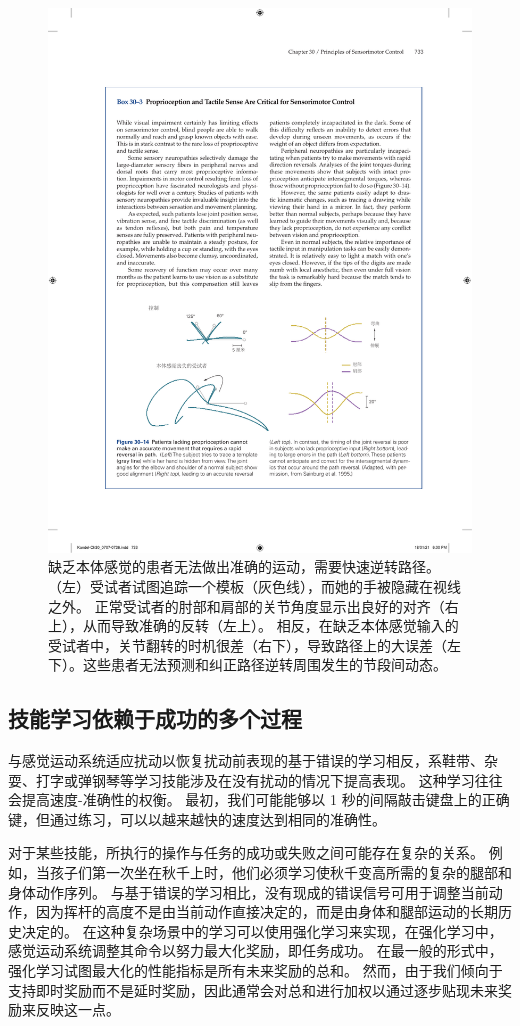 \begin{figure}[htbp]
	\centering
	\includegraphics[width=0.85\linewidth]{chap30/fig_30_14}
	\caption{缺乏本体感觉的患者无法做出准确的运动，需要快速逆转路径。
		（左）受试者试图追踪一个模板（灰色线），而她的手被隐藏在视线之外。
		正常受试者的肘部和肩部的关节角度显示出良好的对齐（右上），从而导致准确的反转（左上）。
		相反，在缺乏本体感觉输入的受试者中，关节翻转的时机很差（右下），导致路径上的大误差（左下）。这些患者无法预测和纠正路径逆转周围发生的节段间动态。}
	\label{fig:30_14}
\end{figure}


\subsection{技能学习依赖于成功的多个过程}

与感觉运动系统适应扰动以恢复扰动前表现的基于错误的学习相反，系鞋带、杂耍、打字或弹钢琴等学习技能涉及在没有扰动的情况下提高表现。
这种学习往往会提高速度-准确性的权衡。
最初，我们可能能够以 1 秒的间隔敲击键盘上的正确键，但通过练习，可以以越来越快的速度达到相同的准确性。


对于某些技能，所执行的操作与任务的成功或失败之间可能存在复杂的关系。
例如，当孩子们第一次坐在秋千上时，他们必须学习使秋千变高所需的复杂的腿部和身体动作序列。
与基于错误的学习相比，没有现成的错误信号可用于调整当前动作，因为挥杆的高度不是由当前动作直接决定的，而是由身体和腿部运动的长期历史决定的。
在这种复杂场景中的学习可以使用强化学习来实现，在强化学习中，感觉运动系统调整其命令以努力最大化奖励，即任务成功。
在最一般的形式中，强化学习试图最大化的性能指标是所有未来奖励的总和。
然而，由于我们倾向于支持即时奖励而不是延时奖励，因此通常会对总和进行加权以通过逐步贴现未来奖励来反映这一点。



